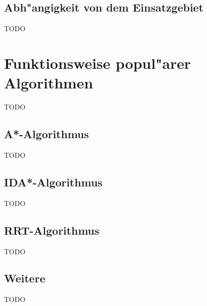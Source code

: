 \subsection{Abh"angigkeit von dem Einsatzgebiet} 
TODO

\section{Funktionsweise popul"arer Algorithmen}
TODO

\subsection{A*-Algorithmus}
TODO

\subsection{IDA*-Algorithmus}
TODO

\subsection{RRT-Algorithmus}
TODO

\subsection{Weitere}
TODO
